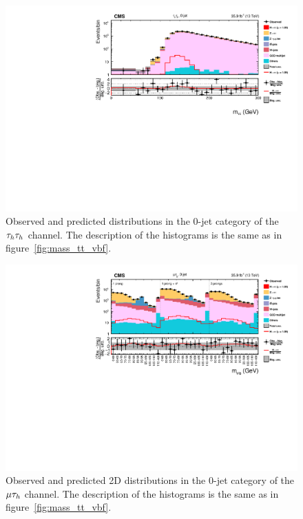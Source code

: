 \begin{figure}[htbp]
\centering
     \includegraphics[width=1.0\textwidth]{higgs_to_taus/plots/Figure_014.pdf}
     \caption{Observed and predicted distributions in the 0-jet category of the $\tau_{h}\tau_{h}$ channel. The description of the histograms is the same as in figure~\ref{fig:mass_tt_vbf}.}
     \label{fig:mass_tt_0jet}
\end{figure}



\begin{figure}[htbp]
\centering
     \includegraphics[width=1.0\textwidth]{higgs_to_taus/plots/Figure_015.pdf}
     \caption{Observed and predicted 2D distributions in the 0-jet category of the $\mu\tau_{h}$ channel. The description of the histograms is the same as in figure~\ref{fig:mass_tt_vbf}.}
     \label{fig:mass_mt_0jet}
\end{figure}

